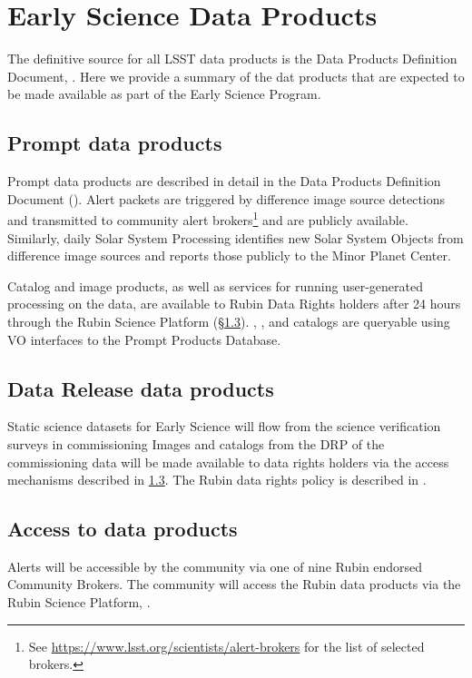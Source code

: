 \section{Early Science Data Products} 
\label{sec:data}

The definitive source for all LSST data products is the Data Products Definition Document, \citep{LSE-163}.
Here we provide a summary of the dat products that are expected to be made available as part of the Early Science Program. 

\subsection{Prompt data products}

Prompt data products are described in detail in the Data Products Definition Document (\DPDD).
Alert packets are triggered by difference image source detections and transmitted to community alert brokers\footnote{See \url{https://www.lsst.org/scientists/alert-brokers} for the list of selected brokers.} and are publicly available. 
Similarly, daily Solar System Processing identifies new Solar System Objects from difference image sources and reports those publicly to the Minor Planet Center.

Catalog and image products, as well as services for running user-generated processing on the data, are available to Rubin Data Rights holders after 24 hours through the Rubin Science Platform (\S \ref{ssec:dataaccess}).
\DIASource, \DIAObject, and \SSObject catalogs are queryable using VO interfaces to the Prompt Products Database.


\subsection{Data Release data products}
Static science datasets for Early Science will flow from the science verification surveys in commissioning
Images and catalogs from the DRP of the commissioning data will be made available to data rights holders via the access mechanisms described in \ref{ssec:dataaccess}.
The Rubin data rights policy is described in  \cite{RDO-013}.


\subsection{Access to \es data products}\label{ssec:dataaccess}
Alerts will be accessible by the community via one of nine Rubin endorsed Community Brokers. 
The community will access the Rubin data products via the Rubin Science Platform, \citep{LSE-319}.


